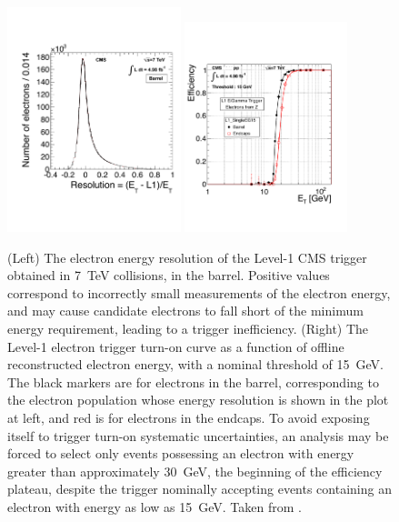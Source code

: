     \begin{figure}[h!]
      \centering
      \includegraphics[width=0.45\textwidth]{figures/L1_res.pdf}
      \includegraphics[width=0.42\textwidth]{figures/electron_turnon.pdf}
      \caption[Level-1 trigger electron energy resolution and associated turn-on curve.]{
        (Left) The electron energy resolution of the Level-1 CMS trigger obtained in 7~TeV collisions, in the barrel.
        Positive values correspond to incorrectly small measurements of the electron energy, and may cause candidate electrons to fall short of the minimum energy requirement, leading to a trigger inefficiency.
        (Right) The Level-1 electron trigger turn-on curve as a function of offline reconstructed electron energy, with a nominal threshold of 15~GeV.
        The black markers are for electrons in the barrel, corresponding to the electron population whose energy resolution is shown in the plot at left, and red is for electrons in the endcaps.
        To avoid exposing itself to trigger turn-on systematic uncertainties, an analysis may be forced to select only events possessing an electron with energy greater than approximately 30~GeV, the beginning of the efficiency plateau, despite the trigger nominally accepting events containing an electron with energy as low as 15~GeV.
        Taken from \cite{trigger}.}
      \label{fig:L1res}
    \end{figure}      

